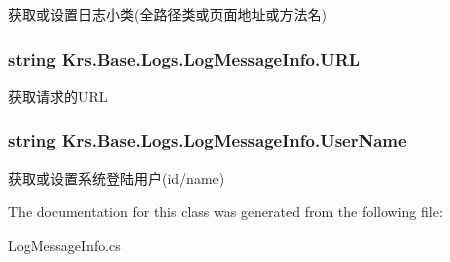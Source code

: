 获取或设置日志小类(全路径类或页面地址或方法名) 

\hypertarget{class_krs_1_1_base_1_1_logs_1_1_log_message_info_ac4632df2e0cca88fce2921fcb17f7cc4}{
\subsubsection[{U\-R\-L}]{\setlength{\rightskip}{0pt plus 5cm}string Krs.\-Base.\-Logs.\-Log\-Message\-Info.\-U\-R\-L\hspace{0.3cm}{\ttfamily [get]}}}\label{class_krs_1_1_base_1_1_logs_1_1_log_message_info_ac4632df2e0cca88fce2921fcb17f7cc4}


获取请求的\-U\-R\-L 

\hypertarget{class_krs_1_1_base_1_1_logs_1_1_log_message_info_a8fa26acb35e4aa3e7aebb41f3ad9a431}{
\subsubsection[{User\-Name}]{\setlength{\rightskip}{0pt plus 5cm}string Krs.\-Base.\-Logs.\-Log\-Message\-Info.\-User\-Name\hspace{0.3cm}{\ttfamily [get]}}}\label{class_krs_1_1_base_1_1_logs_1_1_log_message_info_a8fa26acb35e4aa3e7aebb41f3ad9a431}


获取或设置系统登陆用户(id/name) 



The documentation for this class was generated from the following file\-:\begin{DoxyCompactItemize}
\item 
Log\-Message\-Info.\-cs\end{DoxyCompactItemize}

